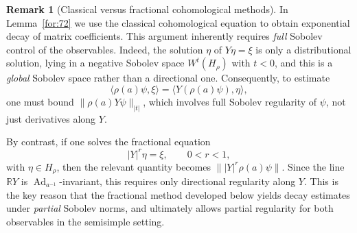 \documentclass[11 pt]{amsart}
\theoremstyle{definition}
\newtheorem{remark}[theorem]{Remark}
\numberwithin{equation}{section}
\DeclareMathOperator{\Ad}{Ad}
\begin{document}
\begin{remark}[Classical versus fractional cohomological methods]
In Lemma~\ref{for:72} we use the classical cohomological equation to obtain
exponential decay of matrix coefficients. This argument inherently requires
\emph{full} Sobolev control of the observables. Indeed, the solution
\(\eta\) of \(Y\eta=\xi\) is only a distributional solution, lying in a
negative Sobolev space \(W^t(H_\rho)\) with \(t<0\), and this is a
\emph{global} Sobolev space rather than a directional one. Consequently,
to estimate
\[
\langle \rho(a)\psi,\xi\rangle
=
\langle Y(\rho(a)\psi),\eta\rangle,
\]
one must bound \(\|\rho(a)Y\psi\|_{|t|}\), which involves full Sobolev
regularity of \(\psi\), not just derivatives along \(Y\).

By contrast, if one solves the fractional equation
\[
|Y|^r\eta=\xi,\qquad 0<r<1,
\]
with \(\eta\in H_\rho\), then the relevant quantity becomes
\(\||Y|^r\rho(a)\psi\|\). Since the line \(\mathbb{R}Y\) is
\(\Ad_{a^{-1}}\)-invariant, this requires only directional regularity
along \(Y\). This is the key reason that the fractional method developed
below yields decay estimates under \emph{partial} Sobolev norms, and
ultimately allows partial regularity for both observables in the
semisimple setting.
\end{remark}
\end{document}

